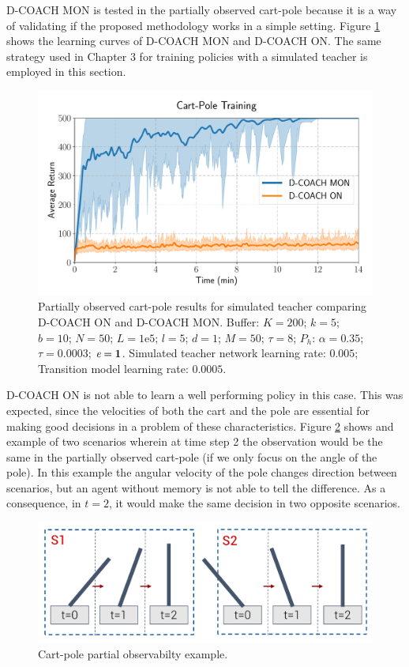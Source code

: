 D-COACH MON is tested in the partially observed cart-pole because it is a way of validating if the proposed methodology works in a simple setting. Figure \ref{fig:ld_cartpole_model} shows the learning curves of D-COACH MON and D-COACH ON. The same strategy used in Chapter 3 for training policies with a simulated teacher is employed in this section.

\begin{figure}[H]
    \centering
    \includegraphics[width=0.8\linewidth]{imagenes/cap3/cartpole_LD_model.pdf}
    \caption{Partially observed cart-pole results for simulated teacher comparing D-COACH ON and D-COACH MON.  Buffer: $K = 200$; $k=5$; $b = 10$; $N = 50$; $L=1\mathrm{e}5$; $l=5$; $d=1$; $M=50$; $\tau=8$; $P_{h}$: $\alpha = 0.35$; $\tau = 0.0003$; $\emph{e}=\textbf{1}$. Simulated teacher network learning rate: $0.005$; Transition model learning rate: $0.0005$.}
    \label{fig:ld_cartpole_model}
\end{figure}

D-COACH ON is not able to learn a well performing policy in this case. This was expected, since the velocities of both the cart and the pole are essential for making good decisions in a problem of these characteristics. Figure \ref{fig:cp_ex} shows and example of two scenarios wherein at time step 2 the observation would be the same in the partially observed cart-pole (if we only focus on the angle of the pole). In this example the angular velocity of the pole changes direction between scenarios, but an agent without memory is not able to tell the difference. As a consequence, in $t=2$, it would make the same decision in two opposite scenarios.

\begin{figure}[H]
    \centering
    \includegraphics[width=0.9\linewidth]{imagenes/cap4/cartpole_ex.pdf}
    \caption{Cart-pole partial observabilty example.}
    \label{fig:cp_ex}
\end{figure}

